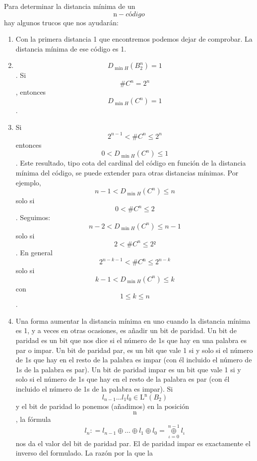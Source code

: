 \documentclass[
]{article}
\begin{document}
\begin{enumerate}
\begin{enumerate}
\begin{enumerate}
      Para determinar la distancia mínima de un
      \[\mathtt{\mathrm{n}} - \mathit{código}\]hay algunos trucos que
      nos ayudarán:

      \begin{enumerate}
      \def\labelenumiv{\arabic{enumiv}.}
      \item
        Con la primera distancia 1 que encontremos podemos dejar de
        comprobar. La distancia mínima de ese código es 1.
      \item
        \[D_{\min H}{\left( B_{2}^{n} \right) = 1}\].
        Si\[\#{C^{n} = 2^{n}}\], entonces
        \[D_{\min H}{\left( C^{n} \right) = 1}\].
      \item
        Si \[{2^{n - 1} < \#}{C^{n} \leq 2^{n}}\] entonces
        \[{0 < D_{\min H}}{\left( C^{n} \right) \leq 1}\]. Este
        resultado, tipo cota del cardinal del código en función de la
        distancia mínima del código, se puede extender para otras
        distancias mínimas. Por
        ejemplo,\[{{n - 1} < D_{\min H}}{\left( C^{n} \right) \leq n}\]solo
        si \[{0 < {\# C^{n}}} \leq 2\].
        Seguimos:\[{{n - 2} < D_{\min H}}{\left( C^{n} \right) \leq {n - 1}}\]solo
        si\[{2 < {\# C^{n}}} \leq 2²\]. En general
        \[{2^{{n - k} - 1} < \#}{C^{\mathtt{\mathrm{n}}} \leq 2^{n - k}}\]
        solo si \[{{k - 1} < D_{\min H}}{\left( C^{n} \right) \leq k}\]
        con \[{1 \leq k} \leq n\].
      \item
        Una forma aumentar la distancia mínima en uno cuando la
        distancia mínima es 1, y a veces en otras ocasiones, es añadir
        un bit de paridad. Un bit de paridad es un bit que nos dice si
        el número de 1s que hay en una palabra es par o impar. Un bit de
        paridad par, es un bit que vale 1 si y solo si el número de 1s
        que hay en el resto de la palabra es impar (con él incluido el
        número de 1s de la palabra es par). Un bit de paridad impar es
        un bit que vale 1 si y solo si el número de 1s que hay en el
        resto de la palabra es par (con él incluido el número de 1s de
        la palabra es impar). Si
        \[{l_{n - 1}\ldots l_{1}l_{0}} \in {\mathtt{\mathrm{L}}^{\mathtt{\mathrm{n}}}\left( B_{2} \right)}\]y
        el bit de paridad lo ponemos (añadimos) en la posición
        \[\mathtt{\mathrm{n}}\], la fórmula
        \[l_{n}{: = l_{n - 1}} \oplus \ldots \oplus l_{1} \oplus {l_{0} = \underset{\iota = 0}{\overset{n - 1}{\oplus}}}l_{\iota}\]
        nos da el valor del bit de paridad par. El de paridad impar es
        exactamente el inverso del formulado. La ra\-zón por la que la

\end{enumerate}
\end{enumerate}
\end{enumerate}
\end{enumerate}
\end{document}
